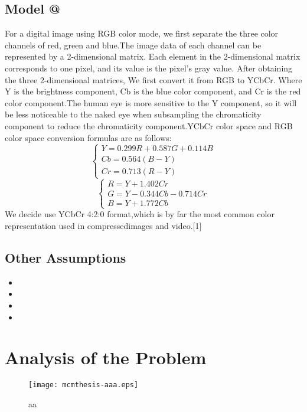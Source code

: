 \documentclass{mcmthesis}
\makeatletter
\newcommand{\Rmnum}[1]{\expandafter\@slowromancap\romannumeral #1@}
\makeatother
\begin{document}
\subsection{Model \Rmnum{1}}
For a digital image using RGB color mode, we first separate the three color channels of red, green and blue.The image data of each channel can be represented by a 2-dimensional matrix. Each element in the 2-dimensional matrix corresponds to one pixel, and its value is the pixel's gray value. After obtaining the three 2-dimensional matrices, We first convert it from RGB to YCbCr. Where Y is the brightness component, Cb is the blue color component, and Cr is the red color component.The human eye is more sensitive to the Y component, so it will be less noticeable to the naked eye when subsampling the chromaticity component to reduce the chromaticity component.YCbCr color space and RGB color space conversion formulas are as follows:
\begin{equation}
\begin{cases}Y=0.299R+0.587G+0.114B\\Cb=0.564(B-Y)\\Cr=0.713(R-Y)\end{cases}
\end{equation}
\begin{equation}
\begin{cases}R=Y+1.402Cr\\G=Y-0.344Cb-0.714Cr\\B=Y+1.772Cb\end{cases}
\end{equation}
We decide use YCbCr 4:2:0 format,which is by far the most common color representation used in compressedimages and video.[1] 

\subsection{Other Assumptions}
\lipsum[6]
\begin{itemize}
\item
\item
\item
\item
\end{itemize}

\lipsum[7]

\section{Analysis of the Problem}
\begin{figure}[h]
\small
\centering
\texttt{[image: mcmthesis-aaa.eps]}
\caption{aa} \label{fig:aa}
\end{figure}
\end{document}
